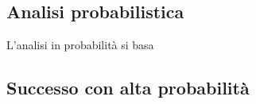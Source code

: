 \subsection{Analisi probabilistica}
L'analisi in probabilità si basa 
\label{sub:karger-success-probability}

\subsection{Successo con alta probabilità}
\label{sub:karger-success-whp}
